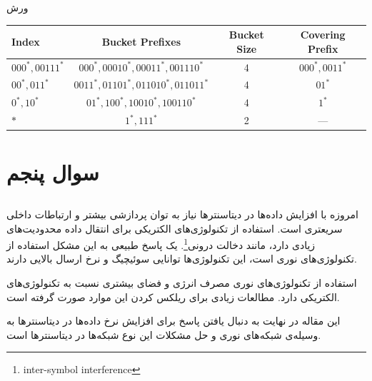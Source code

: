 \documentclass[paper=a4, fontsize=11pt]{article}
\numberwithin{equation}{section} %
\numberwithin{figure}{section} %
\numberwithin{table}{section} %
\begin{document}
\par
ورش 

\begin{center}
\begin{latin}
\begin{tabular}{ l  c  c  c }
    \hline
    Index & Bucket Prefixes & Bucket Size & Covering Prefix \\
    \hline
    $000^*, 00111^*$ & $000^*, 00010^*, 00011^*, 001110^*$ & 4 & $000^*, 0011^*$ \\
    $00^*, 011^*$ & $0011^*, 01101^*, 011010^*, 011011^*$ & 4 & $01^*$ \\
    $0^*, 10^*$ & $01^*, 100^*, 10010^*, 100110^*$ & 4 & $1^*$ \\
    $*$ & $1^*, 111^*$ & 2 & --- \\
    \hline
\end{tabular}
\end{latin}
\end{center}

\section{سوال پنجم}
\subsection{}
\par
امروزه با افزایش داده‌ها در دیتاسنترها نیاز به توان پردازشی بیشتر و ارتباطات داخلی سریعتری است.
استفاده از تکنولوژی‌های الکتریکی برای انتقال داده محدودیت‌های زیادی دارد، مانند دخالت درونی\footnote{inter-symbol interference}.
یک پاسخ طبیعی به این مشکل استفاده از تکنولوژی‌های نوری است، این تکنولوژی‌ها توانایی سوئیچیگ و نرخ ارسال
بالایی دارند.

\par
استفاده از تکنولوژی‌های نوری مصرف انرژی و فضای بیشتری نسبت به تکنولوژی‌های الکتریکی دارد.
مطالعات زیادی برای ریلکس کردن این موارد صورت گرفته است.

\par
این مقاله در نهایت به دنبال یافتن پاسخ برای افزایش نرخ داده‌ها در دیتاسنترها به وسیله‌ی شبکه‌های نوری و
حل مشکلات این نوع شبکه‌ها در دیتاسنترها است.
\end{document}
